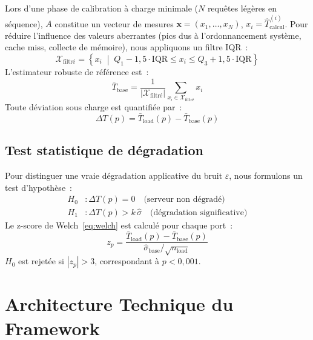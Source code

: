 \documentclass[10pt,conference,compsoc]{IEEEtran}
\begin{document}
Lors d'une phase de calibration à charge minimale ($N$ requêtes légères
en séquence), $A$ constitue un vecteur de mesures
$\mathbf{x} = (x_1, \ldots, x_N)$, $x_i = \hat{T}_{\mathrm{calcul}}^{(i)}$.
Pour réduire l'influence des valeurs aberrantes (pics dus à
l'ordonnancement système, cache miss, collecte de mémoire), nous
appliquons un filtre IQR~:
\begin{equation}
    \mathcal{X}_{\mathrm{filtré}} = \left\{ x_i \;\middle|\;
    Q_1 - 1{,}5 \cdot \mathrm{IQR} \leq x_i \leq Q_3 + 1{,}5 \cdot \mathrm{IQR} \right\}
    \label{eq:iqr}
\end{equation}
L'estimateur robuste de référence est~:
\begin{equation}
    \bar{T}_{\mathrm{base}} = \frac{1}{|\mathcal{X}_{\mathrm{filtré}}|}
    \sum_{x_i \in \mathcal{X}_{\mathrm{filtré}}} x_i
    \label{eq:baseline}
\end{equation}
Toute déviation sous charge est quantifiée par~:
\begin{equation}
    \Delta T(p) = \bar{T}_{\mathrm{load}}(p) - \bar{T}_{\mathrm{base}}(p)
    \label{eq:delta}
\end{equation}

\subsection{Test statistique de dégradation}

Pour distinguer une vraie dégradation applicative du bruit $\varepsilon$,
nous formulons un test d'hypothèse~:
\begin{align}
    H_0 &: \Delta T(p) = 0 \quad \text{(serveur non dégradé)} \\
    H_1 &: \Delta T(p) > k\,\hat{\sigma} \quad \text{(dégradation significative)}
\end{align}
Le z-score de Welch~\eqref{eq:welch} est calculé pour chaque port~:
\begin{equation}
    z_p = \frac{\bar{T}_{\mathrm{load}}(p) - \bar{T}_{\mathrm{base}}(p)}
    {\hat{\sigma}_{\mathrm{base}} / \sqrt{n_{\mathrm{load}}}}
    \label{eq:welch}
\end{equation}
$H_0$ est rejetée si $|z_p| > 3$, correspondant à $p < 0{,}001$.

\section{Architecture Technique du Framework}
\label{sec:architecture}
\end{document}
